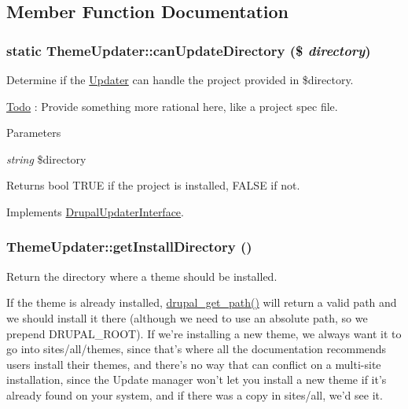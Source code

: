 \subsection{Member Function Documentation}
\hypertarget{classThemeUpdater_a5a7a2a58d90d97545d32a41af99a6afc}{
\subsubsection[{canUpdateDirectory}]{\setlength{\rightskip}{0pt plus 5cm}static ThemeUpdater::canUpdateDirectory (\$ {\em directory})}}
\label{classThemeUpdater_a5a7a2a58d90d97545d32a41af99a6afc}
Determine if the \hyperlink{classUpdater}{Updater} can handle the project provided in \$directory.

\begin{Desc}
\item[\hyperlink{todo__todo000008}{Todo}]: Provide something more rational here, like a project spec file.\end{Desc}

\begin{DoxyParams}{Parameters}
\item[{\em string}]\$directory\end{DoxyParams}
\begin{DoxyReturn}{Returns}
bool TRUE if the project is installed, FALSE if not. 
\end{DoxyReturn}


Implements \hyperlink{interfaceDrupalUpdaterInterface_a3ff6c92f6ed593e03f5e36788ef2d2cc}{DrupalUpdaterInterface}.\hypertarget{classThemeUpdater_a3c3305b406350c7e0c9cca377e5b50d6}{
\subsubsection[{getInstallDirectory}]{\setlength{\rightskip}{0pt plus 5cm}ThemeUpdater::getInstallDirectory ()}}
\label{classThemeUpdater_a3c3305b406350c7e0c9cca377e5b50d6}
Return the directory where a theme should be installed.

If the theme is already installed, \hyperlink{common_8inc_ae3bbe8f97bf07bb0eaf4580c98f9bf94}{drupal\_\-get\_\-path()} will return a valid path and we should install it there (although we need to use an absolute path, so we prepend DRUPAL\_\-ROOT). If we're installing a new theme, we always want it to go into sites/all/themes, since that's where all the documentation recommends users install their themes, and there's no way that can conflict on a multi-\/site installation, since the Update manager won't let you install a new theme if it's already found on your system, and if there was a copy in sites/all, we'd see it. 

